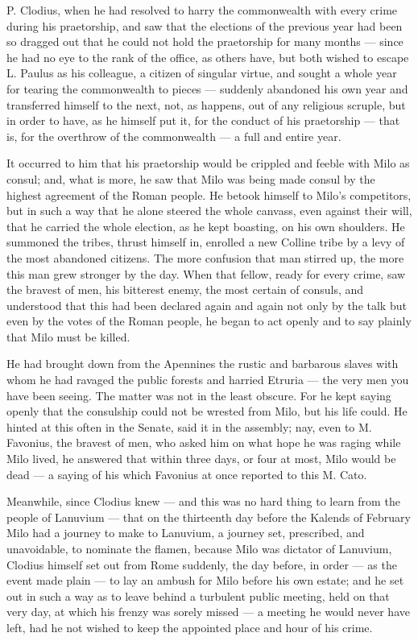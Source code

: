  P. Clodius, when he had resolved to harry the commonwealth with every crime during his praetorship, and saw that the elections of the previous year had been so dragged out that he could not hold the praetorship for many months --- since he had no eye to the rank of the office, as others have, but both wished to escape L. Paulus as his colleague, a citizen of singular virtue, and sought a whole year for tearing the commonwealth to pieces --- suddenly abandoned his own year and transferred himself to the next, not, as happens, out of any religious scruple, but in order to have, as he himself put it, for the conduct of his praetorship --- that is, for the overthrow of the commonwealth --- a full and entire year.

 It occurred to him that his praetorship would be crippled and feeble with Milo as consul; and, what is more, he saw that Milo was being made consul by the highest agreement of the Roman people. He betook himself to Milo's competitors, but in such a way that he alone steered the whole canvass, even against their will, that he carried the whole election, as he kept boasting, on his own shoulders. He summoned the tribes, thrust himself in, enrolled a new Colline tribe by a levy of the most abandoned citizens. The more confusion that man stirred up, the more this man grew stronger by the day. When that fellow, ready for every crime, saw the bravest of men, his bitterest enemy, the most certain of consuls, and understood that this had been declared again and again not only by the talk but even by the votes of the Roman people, he began to act openly and to say plainly that Milo must be killed.

 He had brought down from the Apennines the rustic and barbarous slaves with whom he had ravaged the public forests and harried Etruria --- the very men you have been seeing. The matter was not in the least obscure. For he kept saying openly that the consulship could not be wrested from Milo, but his life could. He hinted at this often in the Senate, said it in the assembly; nay, even to M. Favonius, the bravest of men, who asked him on what hope he was raging while Milo lived, he answered that within three days, or four at most, Milo would be dead --- a saying of his which Favonius at once reported to this M. Cato.

 Meanwhile, since Clodius knew --- and this was no hard thing to learn from the people of Lanuvium --- that on the thirteenth day before the Kalends of February Milo had a journey to make to Lanuvium, a journey set, prescribed, and unavoidable, to nominate the flamen, because Milo was dictator of Lanuvium, Clodius himself set out from Rome suddenly, the day before, in order --- as the event made plain --- to lay an ambush for Milo before his own estate; and he set out in such a way as to leave behind a turbulent public meeting, held on that very day, at which his frenzy was sorely missed --- a meeting he would never have left, had he not wished to keep the appointed place and hour of his crime.

